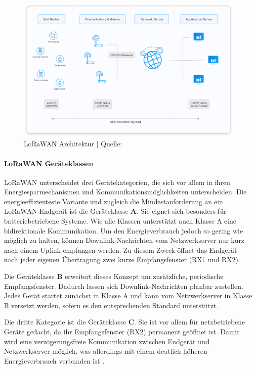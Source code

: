\begin{figure}[H]
\centering
\includegraphics[scale=.135]{figures/asstes/lorawan-architecture.png}
\caption{LoRaWAN Architektur | Quelle: \cite{LoRaWANArchitecture}}
\label{fig:lorawan-architektur}
\end{figure} 

\paragraph*{LoRaWAN Geräteklassen}
LoRaWAN unterscheidet drei Gerätekategorien, die sich vor allem in ihren Energiesparmechanismen und Kommunikationsmöglichkeiten unterscheiden. Die energieeffizienteste Variante und zugleich die Mindestanforderung an ein LoRaWAN-Endgerät ist die Geräteklasse \textbf{A}. Sie eignet sich besonders für batteriebetriebene Systeme. Wie alle Klassen unterstützt auch Klasse A eine bidirektionale Kommunikation. Um den Energieverbrauch jedoch so gering wie möglich zu halten, können Downlink-Nachrichten vom Netzwerkserver nur kurz nach einem Uplink empfangen werden. Zu diesem Zweck öffnet das Endgerät nach jeder eigenen Übertragung zwei kurze Empfangsfenster (RX1 und RX2).

Die Geräteklasse \textbf{B} erweitert dieses Konzept um zusätzliche, periodische Empfangsfenster. Dadurch lassen sich Downlink-Nachrichten planbar zustellen. Jedes Gerät startet zunächst in Klasse A und kann vom Netzwerkserver in Klasse B versetzt werden, sofern es den entsprechenden Standard unterstützt.

Die dritte Kategorie ist die Geräteklasse \textbf{C}. Sie ist vor allem für netzbetriebene Geräte gedacht, da ihr Empfangsfenster (RX2) permanent geöffnet ist. Damit wird eine verzögerungsfreie Kommunikation zwischen Endgerät und Netzwerkserver möglich, was allerdings mit einem deutlich höheren Energieverbrauch verbunden ist \autocite{sornin2015lorawan}.

